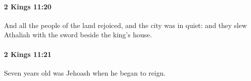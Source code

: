 		\paragraph{2 Kings 11:20} %
			\label{2KINGS-11-20}

			And all the people of the land rejoiced, and the city was in quiet: and they slew Athaliah with the sword beside the king’s house.


		\paragraph{2 Kings 11:21} %
			\label{2KINGS-11-21}

			Seven years old was Jehoash when he began to reign.

